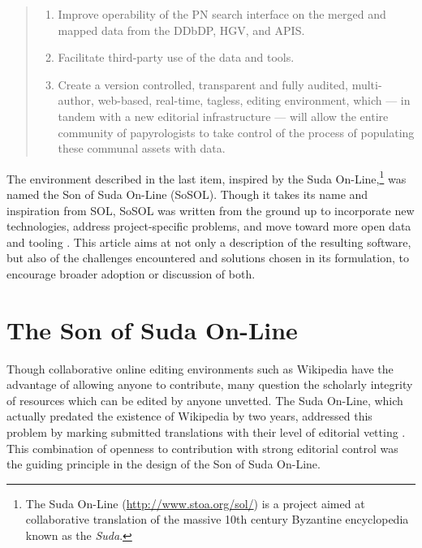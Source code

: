 \documentclass[]{article}
\begin{document}
\begin{quote}
  \begin{enumerate}
    \item Improve operability of the PN search interface on the merged and mapped data from the DDbDP, HGV, and APIS.
    \item Facilitate third-party use of the data and tools.
    \item Create a version controlled, transparent and fully audited, multi-author, web-based, real-time, tagless, editing environment, which — in tandem with a new editorial infrastructure — will allow the entire community of papyrologists to take control of the process of populating these communal assets with data.
  \end{enumerate}
\end{quote}The environment described in the last item, inspired by the Suda On-Line,\footnote{The Suda On-Line (\url{http://www.stoa.org/sol/}) is a project aimed at collaborative translation of the massive 10th century Byzantine encyclopedia known as the \emph{Suda}.} was named the Son of Suda On-Line (SoSOL). Though it takes its name and inspiration from SOL, SoSOL was written from the ground up to incorporate new technologies, address project-specific problems, and move toward more open data and tooling \citep{background, sosin}. This article aims at not only a description of the resulting software, but also of the challenges encountered and solutions chosen in its formulation, to encourage broader adoption or discussion of both.

\section*{The Son of Suda On-Line}

Though collaborative online editing environments such as Wikipedia have the advantage of allowing anyone to contribute, many question the scholarly integrity of resources which can be edited by anyone unvetted. The Suda On-Line, which actually predated the existence of Wikipedia by two years, addressed this problem by marking submitted translations with their level of editorial vetting \citep{finkel}. This combination of openness to contribution with strong editorial control was the guiding principle in the design of the Son of Suda On-Line.
\end{document}
